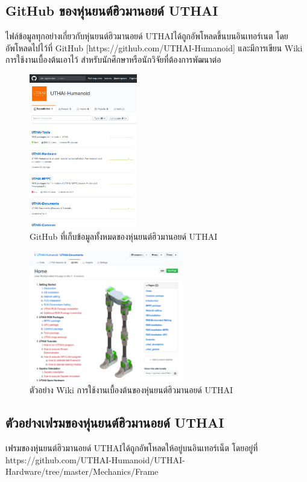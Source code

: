\subsection{GitHub ของหุ่นยนต์ฮิวมานอยด์ UTHAI}
ไฟล์ข้อมูลทุกอย่างเกี่ยวกับหุ่นยนต์ฮิวมานอยด์ UTHAIได้ถูกอัพโหลดขึ้นบนอินเทอร์เนต
โดยอัพโหลดไปไว้ที่ GitHub [https://github.com/UTHAI-Humanoid] และมีการเขียน Wiki การใช้งานเบื้องต้นเอาไว้
สำหรับนักศึกษาหรือนักวิจัยที่ต้องการพัฒนาต่อ 
\begin{figure}[!ht]
	\centering
	\includegraphics[width=0.42\textwidth]{chapter4/images/uthai_manual/uthai_github.png}
	\caption{GitHub ที่เก็บข้อมูลทั้งหมดของหุ่นยนต์ฮิวมานอยด์ UTHAI}
\end{figure}
\begin{figure}[!ht]
	\centering
	\includegraphics[width=0.60\textwidth]{chapter4/images/uthai_manual/uthai_github2.png}
	\caption{ตัวอย่าง Wiki การใช้งานเบื้องต้นของหุ่นยนต์ฮิวมานอยด์ UTHAI}
\end{figure}


\clearpage
\subsection{ตัวอย่างเฟรมของหุ่นยนต์ฮิวมานอยด์ UTHAI}
เฟรมของหุ่นยนต์ฮิวมานอยด์ UTHAIได้ถูกอัพโหลดให้อยู่บนอินเทอร์เน็ต โดยอยู่ที่ https://github.com/UTHAI-Humanoid/UTHAI-Hardware/tree/master/Mechanics/Frame

